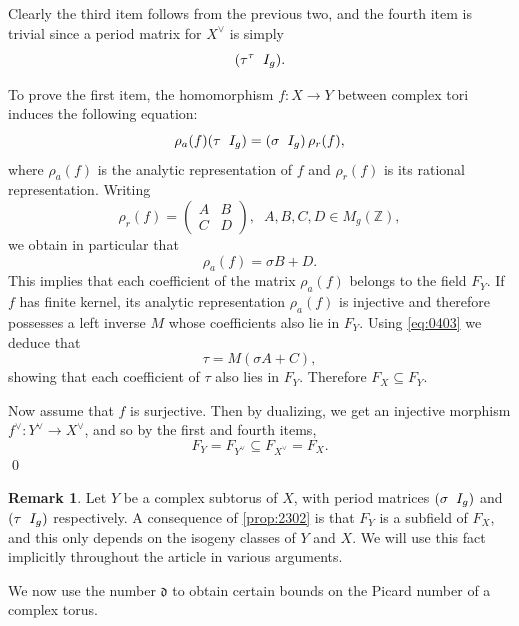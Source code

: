 \documentclass[11pt,leqno]{article}
\theoremstyle{definition}
\newtheorem{remark}{Remark}[section]
\renewenvironment{proof}{{\bfseries \noindent Proof} }{ \qed \\}
\begin{document}
\begin{proof}
Clearly the third item follows from the previous two, and the fourth item is trivial since a period matrix for $X^\vee$ is simply $$(\tau^\tau\hspace{0.2cm}I_g).$$

To prove the first item, the homomorphism $f:X\to Y$ between complex tori induces the following equation:
\begin{equation}
\label{eq:0403}
    \rho_a(f)(\tau\hspace{0.2cm}I_g)=\left(\sigma\hspace{0.2cm}I_g\right)\rho_r(f),
    \end{equation}
where $\rho_a(f)$ is the analytic representation of $f$ and $\rho_r(f)$ is its rational representation. Writing 
$$\rho_r(f)=\left(\begin{array}{cc}A&B\\C&D\end{array}\right),\;\; A,B,C,D\in M_g(\mathbb{Z}),$$ 
we obtain in particular that
\[\rho_a(f)=\sigma B+D.\]
This implies that each coefficient of the matrix $\rho_a(f)$ belongs to the field $F_Y$. If $f$ has finite kernel, its analytic representation $\rho_a(f)$ is injective and therefore possesses a left inverse $M$ whose coefficients also lie in $F_Y$. Using \cref{eq:0403} we deduce that
\[\tau=M(\sigma A+C),\]
showing that each coefficient of $\tau$ also lies in $F_Y$. Therefore $F_X\subseteq F_Y$.

Now assume that $f$ is surjective. Then by dualizing, we get an injective morphism $f^\vee:Y^\vee\to X^\vee$, and so by the first and fourth items,
\[F_Y=F_{Y^\vee}\subseteq F_{X^\vee}=F_X.\]
\end{proof}

\begin{remark}
    \label{rem:2703}
    Let $Y$ be a complex subtorus of $X$, with period matrices $(\sigma\hspace{0.2cm}I_g)$ and $(\tau\hspace{0.2cm}I_g)$ respectively. A consequence of \cref{prop:2302} is that $F_Y$ is a subfield of $F_X$, and this only depends on the isogeny classes of $Y$ and $X.$ We will use this fact implicitly throughout the article in various arguments. 
\end{remark}


We now use the number $\mathfrak{d}$ to obtain certain bounds on the Picard number of a complex torus.
\end{document}
